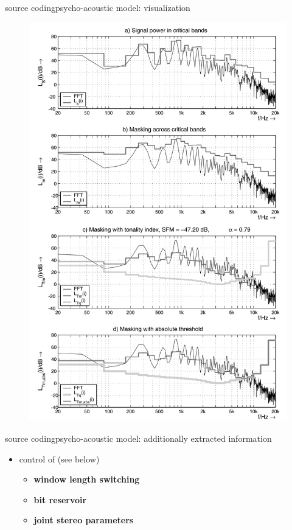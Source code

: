\begin{frame}{source coding}{psycho-acoustic model: visualization}
\begin{figure}
					\includegraphics[scale=0.2]{Graph/psychomodeloutput}
			\end{figure}
	\end{frame}
	
	\begin{frame}{source coding}{psycho-acoustic model: additionally extracted information}
        \begin{itemize}
            \item   control of (see below)
                \begin{itemize}
                    \item \textbf{window length switching}
                    \item   \textbf{bit reservoir} 
                    \item   \textbf{joint stereo parameters}
                \end{itemize}
        \end{itemize}
	\end{frame}
